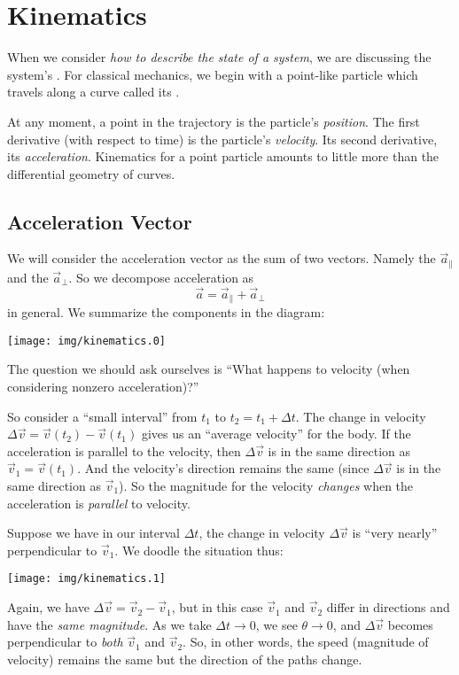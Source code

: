 \section{Kinematics}

When we consider \emph{how to describe the state of a system},
we are discussing the system's . For classical
mechanics, we begin with a point-like particle which travels along a
curve called its . 

At any moment, a point in the trajectory is the particle's
\emph{position}. The first derivative (with respect to time) is the
particle's \emph{velocity}. Its second derivative, its
\emph{acceleration}. Kinematics for a point particle amounts to little
more than the differential geometry of curves.

\subsection{Acceleration Vector}

\M We will consider the acceleration vector as the sum of two
vectors. Namely the  $\vec{a}_{\parallel}$
and the  $\vec{a}_{\perp}$. So we
decompose acceleration as
\begin{equation}
\vec{a} = \vec{a}_{\parallel}+\vec{a}_{\perp}
\end{equation}
in general. We summarize the components in the diagram:
\begin{center}
\texttt{[image: img/kinematics.0]}
\end{center}
\noindent%
The question we should ask ourselves is ``What happens to velocity (when
considering nonzero acceleration)?''

So consider a ``small interval'' from $t_{1}$ to $t_{2}=t_{1}+\Delta t$. 
The change in velocity $\Delta\vec{v}=\vec{v}(t_{2})-\vec{v}(t_{1})$
gives us an ``average velocity'' for the body. If the acceleration is
parallel to the velocity, then $\Delta\vec{v}$ is in the same direction
as $\vec{v}_{1}=\vec{v}(t_{1})$. And the velocity's direction remains the same
(since $\Delta\vec{v}$ is in the same direction as $\vec{v}_{1}$). So
the magnitude for the velocity \emph{changes} when the acceleration is
\emph{parallel} to velocity.

\label{chunk:perpAcceleration}
Suppose we have in our interval $\Delta t$, the change in velocity
$\Delta\vec{v}$ is ``very nearly'' perpendicular to $\vec{v}_{1}$. We
doodle the situation thus:
\begin{center}
\texttt{[image: img/kinematics.1]}
\end{center}
\noindent%
Again, we have $\Delta\vec{v}=\vec{v}_{2}-\vec{v}_{1}$, but in this case
$\vec{v}_{1}$ and $\vec{v}_{2}$ differ in directions and have the
\emph{same magnitude}. As we take $\Delta t\to0$, we see $\theta\to0$,
and $\Delta\vec{v}$ becomes perpendicular to \emph{both} $\vec{v}_1$ and
$\vec{v}_2$. So, in other words, the speed (magnitude of velocity)
remains the same but the direction of the paths change.


